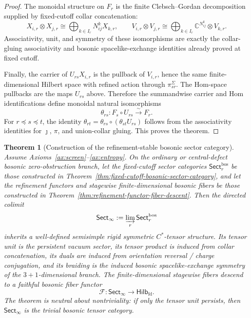 \documentclass[11pt]{article}
\newtheorem{theorem}{Theorem}[section]
\begin{document}
\begin{proof}
The monoidal structure on \(F_r\) is the finite Clebsch--Gordan decomposition supplied by
fixed-cutoff collar concatenation:
\[
X_{i,r}\otimes X_{j,r}\cong
\bigoplus_{k\in I_r}N_{ij}^{k}X_{k,r},
\qquad
V_{i,r}\otimes V_{j,r}\cong
\bigoplus_{k\in I_r}\mathbb C^{N_{ij}^{k}}\otimes V_{k,r}.
\]
Associativity, unit, and symmetry of these isomorphisms are exactly the collar-gluing
associativity and bosonic spacelike-exchange identities already proved at fixed cutoff.

Finally, the carrier of \(U_{rs}X_{i,r}\) is the pullback of \(V_{i,r}\), hence the same
finite-dimensional Hilbert space with refined action through \(\pi_{sr}^{\Sigma}\). The Hom-space
pullbacks are the maps \(U_{rs}\) above. Therefore the summandwise carrier and Hom identifications
define monoidal natural isomorphisms
\[
\theta_{rs}:F_s\circ U_{rs}\xrightarrow{\sim}F_r.
\]
For \(r\preceq s\preceq t\), the identity
\(\theta_{rt}=\theta_{rs}\circ(\theta_{st}U_{rs})\) follows from the associativity identities for
\(\jmath\), \(\pi\), and union-collar gluing. This proves the theorem.
\end{proof}

\begin{theorem}[Construction of the refinement-stable bosonic sector category]\label{thm:sector-colimit}
Assume Axioms~\ref{ax:screen}--\ref{ax:entropy}. On the ordinary or central-defect bosonic
zero-obstruction branch, let the fixed-cutoff sector categories
\(\mathsf{Sect}^{\mathrm{bos}}_r\) be those constructed in
Theorem~\ref{thm:fixed-cutoff-bosonic-sector-category}, and let the refinement functors and
stagewise finite-dimensional bosonic fibers be those constructed in
Theorem~\ref{thm:refinement-functor-fiber-descent}. Then the directed colimit
\[
\mathsf{Sect}_\infty:=\varinjlim_r \mathsf{Sect}^{\mathrm{bos}}_r
\]
inherits a well-defined semisimple rigid symmetric \(C^*\)-tensor structure. Its tensor unit is
the persistent vacuum sector, its tensor product is induced from collar concatenation, its duals
are induced from orientation reversal / charge conjugation, and its braiding is the induced
bosonic spacelike-exchange symmetry of the \(3+1\)-dimensional branch. The finite-dimensional
stagewise fibers descend to a faithful bosonic fiber functor
\[
\mathcal F:\mathsf{Sect}_\infty\to\mathsf{Hilb}_{\mathrm{fd}}.
\]
The theorem is neutral about nontriviality: if only the tensor unit persists, then
\(\mathsf{Sect}_\infty\) is the trivial bosonic tensor category.
\end{theorem}
\end{document}
